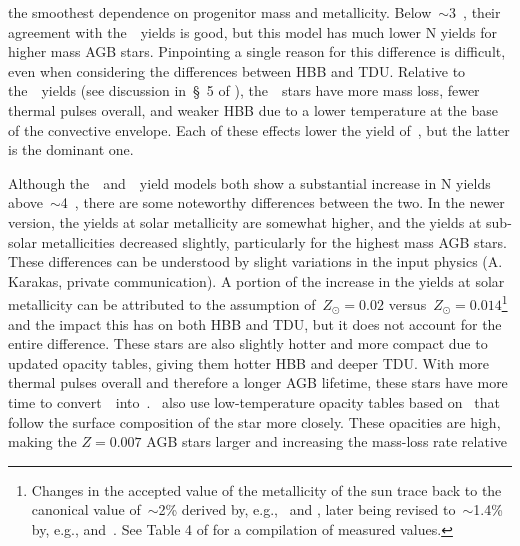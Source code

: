 the smoothest dependence on progenitor mass and metallicity.
Below~$\sim$3~\msun, their agreement with the~\karakas~yields is good, but this
model has much lower N yields for higher mass AGB stars.
Pinpointing a single reason for this difference is difficult, even when
considering the differences between HBB and TDU.
Relative to the~\karakas~yields (see discussion in~\S~5 of
\citealp{Karakas2016}), the~\cristallo~stars have more mass loss, fewer
thermal pulses overall, and weaker HBB due to a lower temperature at the base
of the convective envelope. 
Each of these effects lower the yield of~\Nfourteen, but the latter is the
dominant one.
\par
Although the~\karakasten~and~\karakas~yield models both show a substantial
increase in N yields above~$\sim$4~\msun, there are some noteworthy differences
between the two.
In the newer version, the yields at solar metallicity are somewhat higher,
and the yields at sub-solar metallicities decreased slightly, particularly for
the highest mass AGB stars.
These differences can be understood by slight variations in the input physics
(A. Karakas, private communication).
A portion of the increase in the yields at solar metallicity can be attributed
to the assumption of~$Z_\odot = 0.02$ versus~$Z_\odot = 0.014$\footnote{
	Changes in the accepted value of the metallicity of the sun trace back to
	the canonical value of~$\sim$2\% derived by, e.g.,~\citet{Anders1989} and
	\citet{Grevesse1998}, later being revised to~$\sim$1.4\% by, e.g.,
	\citet{Lodders2003} and~\citet*{Asplund2005}. See Table 4 of
	\citet{Asplund2009} for a compilation of measured values.
} and the impact this has on both HBB and TDU, but it does not account for the
entire difference.
These stars are also slightly hotter and more compact due to updated opacity
tables, giving them hotter HBB and deeper TDU.
With more thermal pulses overall and therefore a longer AGB lifetime, these
stars have more time to convert~\Ctwelve~into~\Nfourteen.
\karakas~also use low-temperature opacity tables based on~\citet{Marigo2002}
that follow the surface composition of the star more closely.
These opacities are high, making the
$Z = 0.007$
AGB stars larger and increasing the mass-loss rate relative
